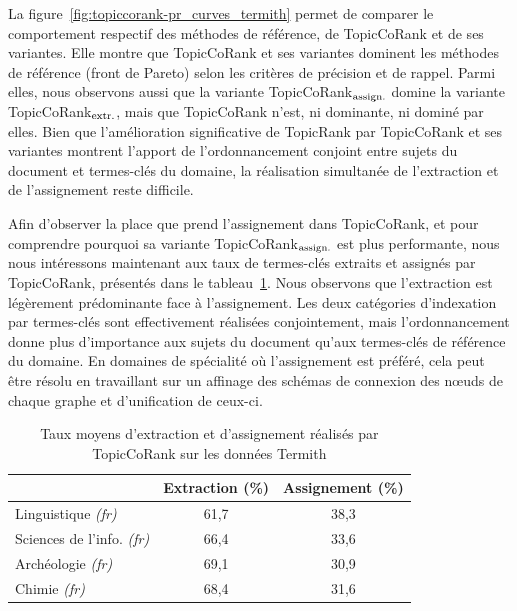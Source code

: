         La figure~\ref{fig:topiccorank-pr_curves_termith} permet de comparer le
        comportement respectif des méthodes de référence, de TopicCoRank et de
        ses variantes. Elle montre que TopicCoRank et ses variantes dominent les
        méthodes de référence (front de Pareto) selon les critères de précision
        et de rappel. Parmi elles, nous observons aussi que la variante
        TopicCoRank$_\textnormal{assign.}$ domine la variante
        TopicCoRank$_\textnormal{extr.}$, mais que TopicCoRank n'est, ni
        dominante, ni dominé par elles. Bien que l'amélioration significative de
        TopicRank par TopicCoRank et ses variantes montrent l'apport de
        l'ordonnancement conjoint entre sujets du document et termes-clés du
        domaine, la réalisation simultanée de l'extraction et de l'assignement
        reste difficile.
        

        Afin d'observer la place que prend l'assignement dans TopicCoRank, et
        pour comprendre pourquoi sa variante TopicCoRank$_\textnormal{assign.}$
        est plus performante, nous nous intéressons maintenant aux taux de
        termes-clés extraits et assignés par TopicCoRank, présentés dans le
        tableau~\ref{tab:assignment_ratio_termith}. Nous observons que
        l'extraction est légèrement prédominante face à l'assignement. Les deux
        catégories d'indexation par termes-clés sont effectivement réalisées
        conjointement, mais l'ordonnancement donne plus d'importance aux sujets
        du document qu'aux termes-clés de référence du domaine. En domaines de
        spécialité où l'assignement est préféré, cela peut être résolu en
        travaillant sur un affinage des schémas de connexion des n\oe{}uds de
        chaque graphe et d'unification de ceux-ci.
        \begin{table}
          \centering
          \begin{tabular}{l|c|c}
              \toprule
              & Extraction (\%) & Assignement (\%)\\
              \hline
              Linguistique \textit{(fr)} & 61,7 & 38,3\\
              Sciences de l'info. \textit{(fr)} & 66,4 & 33,6\\
              Archéologie \textit{(fr)} & 69,1 & 30,9\\
              Chimie \textit{(fr)} & 68,4 & 31,6\\
              \bottomrule
          \end{tabular}
          \caption{Taux moyens d'extraction et d'assignement réalisés par
                   TopicCoRank sur les données Termith
                   \label{tab:assignment_ratio_termith}}
        \end{table}

